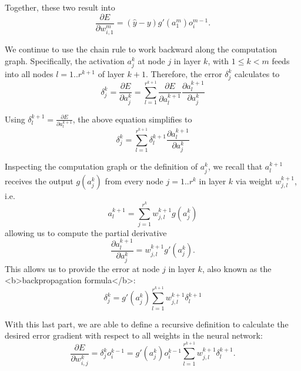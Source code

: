 \documentclass[paper=6.14in:9.21in,pagesize=pdftex,11pt,twoside,openright]{scrbook}
\begin{document}
Together, these two result into
\begin{equation}
\frac{\partial E}{\partial w_{i,1}^m}=(\hat{y}-y)g'(a^m_1)o_i^{m-1}.
\end{equation}

We continue to use the chain rule to work backward along the computation graph. Specifically, the activation $a^k_j$ at node $j$ in layer $k$, with $1\leq k <m$ feeds into all nodes $l=1..r^{k+1}$ of layer $k+1$. Therefore, the error $\delta^k_j$ calculates to
\begin{equation}
\delta^k_j=\frac{\partial E}{\partial a^k_j}=\sum_{l=1}^{r^{k+1}}\frac{\partial E}{\partial a_l^{k+1}}\frac{\partial a_l^{k+1}}{\partial a^k_j}
\end{equation}

Using $\delta^{k+1}_l=\frac{\partial E}{\partial a_l^{k+1}}$, the above equation simplifies to
\begin{equation}
\delta^k_j=\sum_{l=1}^{r^{k+1}}\delta_l^{k+1}\frac{\partial a_l^{k+1}}{\partial a^k_j}
\end{equation}

Inspecting the computation graph or the definition of $a^k_j$, we recall that $a_l^{k+1}$ receives the output $g(a_j^k)$ from every node $j=1..r^k$ in layer $k$ via weight $w_{j,l}^{k+1}$, i.e.
\begin{equation}
a_l^{k+1}=\sum_{j=1}^{r^k}w_{j,l}^{k+1}g(a_j^k)
\end{equation}
allowing us to compute the partial derivative
\begin{equation}
\frac{\partial a_l^{k+1}}{\partial a^k_j}=w_{j,l}^{k+1}g'(a_j^k).
\end{equation}
This allows us to provide the error at node $j$ in layer $k$, also known as the <b>backpropagation formula</b>:
\begin{equation}
\delta^k_j=g'(a^k_j)\sum_{l=1}^{r^{k+1}}w_{j,l}^{k+1}\delta^{k+1}_l
\end{equation}

With this last part, we are able to define a recursive definition to calculate the desired error gradient with respect to all weights in the neural network:
\begin{equation}
\frac{\partial E}{\partial w_{i,j}^k}=\delta_j^ko_i^{k-1}=g'(a_j^k)o_i^{k-1}\sum_{l=1}^{r^{k+1}}w_{j,l}^{k+1}\delta_l^{k+1}.
\end{equation}
\end{document}
